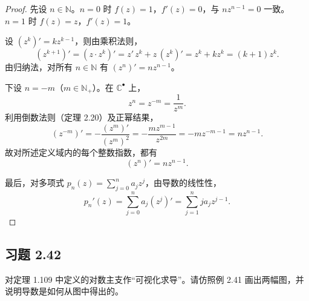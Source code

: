 \documentclass[11pt,a4paper]{article}
\newcommand{\C}{\mathbb{C}}
\newcommand{\N}{\mathbb{N}}
\theoremstyle{definition}
\begin{document}
\begin{proof}
先设 $n\in\N$。$n=0$ 时 $f(z)=1$，$f'(z)=0$，与 $nz^{n-1}=0$ 一致。$n=1$ 时 $f(z)=z$，$f'(z)=1$。

设 $(z^k)'=kz^{k-1}$，则由乘积法则，
\[
  (z^{k+1})'=(z\cdot z^k)'=z'\,z^k+z\,(z^k)'=z^k+kz^k=(k+1)z^k.
\]
由归纳法，对所有 $n\in\N$ 有 $(z^n)'=nz^{n-1}$。

下设 $n=-m$（$m\in\N_+$）。在 $\C^\bullet$ 上，
\[
  z^n=z^{-m}=\frac{1}{z^m}.
\]
利用倒数法则（定理 2.20）及正幂结果，
\[
  (z^{-m})'=-\frac{(z^m)'}{(z^m)^2}
  =-\frac{mz^{m-1}}{z^{2m}}
  =-mz^{-m-1}
  =nz^{n-1}.
\]
故对所述定义域内的每个整数指数，都有
\[
  (z^n)'=nz^{n-1}.
\]

最后，对多项式 $p_n(z)=\sum_{j=0}^n a_j z^j$，由导数的线性性，
\[
  p_n'(z)=\sum_{j=0}^n a_j (z^j)'
  =\sum_{j=1}^n j a_j z^{j-1}.
\]
\end{proof}

\subsection{习题 2.42}

对定理 1.109 中定义的对数主支作“可视化求导”。请仿照例 2.41 画出两幅图，并说明导数是如何从图中得出的。
\end{document}
